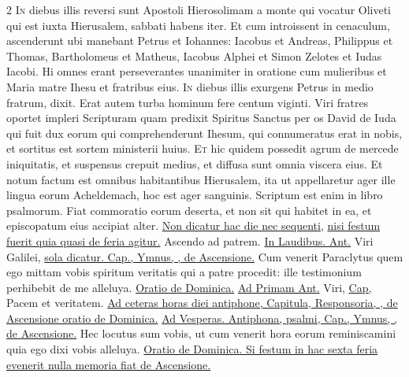 \begin{multicols*}{2}
\lettrine[lines=2]{\zallmancaps \color{Blue} I}{n} diebus illis reversi sunt Apostoli Hierosolimam a monte qui vocatur Oliveti qui est iuxta Hierusalem, sabbati habens iter. Et cum introissent in cenaculum, ascenderunt ubi manebant Petrus et Iohannes: Iacobus et Andreas, Philippus et Thomas, Bartholomeus et Matheus, Iacobus Alphei et Simon Zelotes et Iudas Iacobi. Hi omnes erant perseverantes unanimiter in oratione cum mulieribus et Maria matre Ihesu et fratribus eius.
\lettrine[lines=2]{\zallmancaps \color{Red} I}{n} diebus illis exurgens Petrus in medio fratrum, dixit. Erat autem turba hominum fere centum viginti. Viri fratres oportet impleri Scripturam quam predixit Spiritus Sanctus per os David de Iuda qui fuit dux eorum qui comprehenderunt Ihesum, qui connumeratus erat in nobis, et sortitus est sortem ministerii huius.
\lettrine[lines=2]{\zallmancaps \color{Blue} E}{t} hic quidem possedit agrum de mercede iniquitatis, et suspensus crepuit medius, et diffusa sunt omnia viscera eius. Et notum factum est omnibus habitantibus Hierusalem, ita ut appellaretur ager ille lingua eorum Acheldemach, hoc est ager sanguinis. Scriptum est enim in libro psalmorum. Fiat commoratio eorum deserta, et non sit qui habitet in ea, et episcopatum eius accipiat alter.
\newline \ul{Non dicatur hac die nec sequenti,}  \ul{nisi festum fuerit quia quasi de feria agitur.}
\newline \V Ascendo ad patrem. \ul{In Laudibus. Ant.} Viri Galilei, \ul{sola dicatur. Cap., Ymnus, \Vbar , de Ascensione.}
 Cum venerit Paraclytus quem ego mittam vobis spiritum veritatis qui a patre procedit: ille testimonium perhibebit de me alleluya. \ul{Oratio de Dominica.}
\newline \ul{Ad Primam Ant.} Viri, \ul{Cap,} Pacem et veritatem. \ul{Ad ceteras horas diei antiphone, Capitula, Responsoria, \Vbar , de Ascensione oratio de Dominica.}
\newline \ul{Ad Vesperas. Antiphona, psalmi, Cap., Ymnus, \Vbar , de Ascensione.}
 Hec locutus sum vobis, ut cum venerit hora eorum reminiscamini quia ego dixi vobis alleluya. \ul{Oratio de Dominica. Si festum in hac sexta feria evenerit nulla memoria fiat de Ascensione.}

\end{multicols*}
